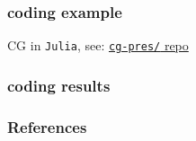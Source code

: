 \documentclass[10pt,dvipsnames*]{beamer}
\begin{document}
%
\begin{frame}
  \frametitle{coding example}
  CG in \texttt{Julia}, see: \href{https://github.com/jacob-roth}{\texttt{cg-pres/} repo}
\end{frame}
%
\begin{frame}
  \frametitle{coding results}
  \centering {}
\end{frame}
%
\begin{frame}[allowframebreaks]
  \frametitle{References}
  
  
\end{frame}
\end{document}
